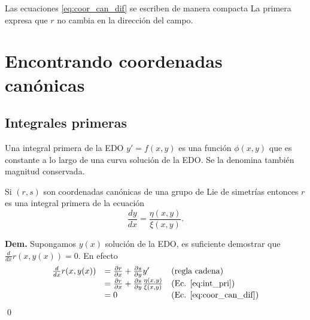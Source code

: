 Las ecuaciones \eqref{eq:coor_can_dif} se escriben de manera compacta
La primera expresa que $r$ no cambia en la dirección del campo.








\section{Encontrando coordenadas canónicas}

 \subsection{Integrales primeras}
\begin{definicion} Una integral primera de la EDO $y'=f(x,y)$ es una función $\phi(x,y)$ que es constante a lo largo de una curva solución de la EDO. Se la denomina también magnitud conservada.
 \end{definicion}



 \begin{teorema} Si $(r,s)$ son coordenadas canónicas de una grupo de Lie de simetrías entonces $r$ es una integral primera de la ecuación
\begin{equation}\label{eq:int_pri} \frac{dy}{dx}=\frac{\eta(x,y)}{\xi(x,y)}.
\end{equation}
\end{teorema}
\textbf{Dem.} Supongamos $y(x)$ solución de la EDO, es suficiente demostrar que $\frac{d}{dx}r(x,y(x))=0$. En efecto
\[
\begin{array}{lll}
 \frac{d}{dx}r(x,y(x)) &=\frac{\partial r}{\partial x}+\frac{\partial s}{\partial y}y' &\text{(regla cadena)}\\
&=\frac{\partial r}{\partial x}+\frac{\partial s}{\partial y}\frac{\eta(x,y)}{\xi(x,y)}& \text{(Ec. \eqref{eq:int_pri})}\\
&=0 & \text{(Ec. \eqref{eq:coor_can_dif})}\\
\end{array}
\]
\qed

